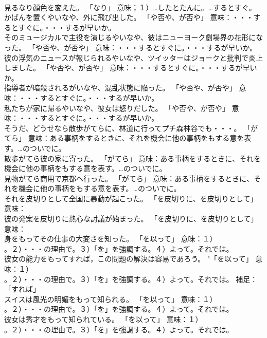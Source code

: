 \documentclass[8pt]{extreport}
\begin{document}
\begin{CJK}{UTF8}{min}
\\	見るなり顔色を変えた。	「なり」 意味；１）…したとたんに。…するとすぐ。	
\\	かばんを置くやいなや、外に飛び出した。	「や否や、が否や」 意味：・・・するとすぐに。・・・するが早いか。	
\\	そのミュージカルで主役を演じるやいなや、彼はニューヨーク劇場界の花形になった。	「や否や、が否や」 意味：・・・するとすぐに。・・・するが早いか。	
\\	彼の浮気のニュースが報じられるやいなや、ツイッターはジョークと批判で炎上しました。	「や否や、が否や」 意味：・・・するとすぐに。・・・するが早いか。	
\\	指導者が暗殺されるがいなや、混乱状態に陥った。	「や否や、が否や」 意味：・・・するとすぐに。・・・するが早いか。	
\\	私たちが家に帰るやいなや、彼女は怒りだした。	「や否や、が否や」 意味：・・・するとすぐに。・・・するが早いか。	
\\	そうだ、どうせなら散歩がてらに、林道に行ってプチ森林谷でも・・・。	「がてら」 意味：ある事柄をするときに、それを機会に他の事柄をもする意を表す。…のついでに。	
\\	散歩がてら彼の家に寄った。	「がてら」 意味：ある事柄をするときに、それを機会に他の事柄をもする意を表す。…のついでに。	
\\	見物がてら商用で京都へ行った。	「がてら」 意味：ある事柄をするときに、それを機会に他の事柄をもする意を表す。…のついでに。	
\\	それを皮切りとして全国に暴動が起こった。	「を皮切りに、を皮切りとして」 意味：
\\	彼の発案を皮切りに熱心な討議が始まった。	「を皮切りに、を皮切りとして」 意味：
\\	身をもってその仕事の大変さを知った。	「を以って」 意味：１）
\\	。２）・・・の理由で。３）「を」を強調する。４）よって。それでは。	
\\	彼女の能力をもってすれば，この問題の解決は容易であろう。	"「を以って」 意味：１）
\\	。２）・・・の理由で。３）「を」を強調する。４）よって。それでは。 補足：「すれば」 
\\	スイスは風光の明媚をもって知られる。	「を以って」 意味：１）
\\	。２）・・・の理由で。３）「を」を強調する。４）よって。それでは。	
\\	彼女は秀才をもって知られている。	「を以って」 意味：１）
\\	。２）・・・の理由で。３）「を」を強調する。４）よって。それでは。	

\end{CJK}
\end{document}
